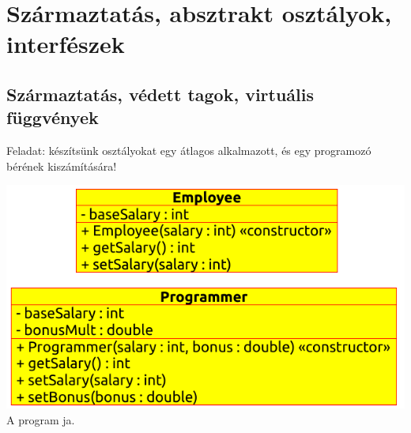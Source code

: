 \section{Származtatás, absztrakt osztályok, interfészek}

\subsection{Származtatás, védett tagok, virtuális függvények}

\begin{frame}
    \small
    Feladat: készítsünk osztályokat egy átlagos alkalmazott, és egy programozó bérének kiszámítására!
    \begin{center}
        \includegraphics[scale=0.75]{inheritance01.eps} \\
        \tiny A program ja.
    \end{center}
\end{frame}

\begin{frame}
    \begin{columns}[T]
            \begin{exampleblock}{}
                \vspace{-.2cm}
                \fontsize{7}{8} \selectfont
                
                \vspace{-.2cm}
            \end{exampleblock}
            \begin{exampleblock}{}
                \vspace{-.2cm}
                \fontsize{7}{8} \selectfont
                
                \vspace{-.2cm}
            \end{exampleblock}
    \end{columns}
\end{frame}

